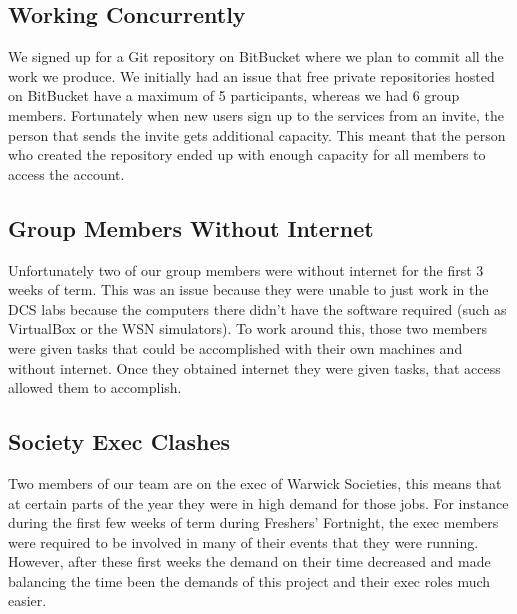 \subsection{Working Concurrently}

We signed up for a Git repository on BitBucket \cite{bitbucket} where we plan to commit all the work we produce. We initially had an issue that free private repositories hosted on BitBucket have a maximum of 5 participants, whereas we had 6 group members. Fortunately when new users sign up to the services from an invite, the person that sends the invite gets additional capacity. This meant that the person who created the repository ended up with enough capacity for all members to access the account.

\subsection{Group Members Without Internet}
Unfortunately two of our group members were without internet for the first 3 weeks of term. This was an issue because they were unable to just work in the DCS labs because the computers there didn't have the software required (such as VirtualBox or the WSN simulators). To work around this, those two members were given tasks that could be accomplished with their own machines and without internet. Once they obtained internet they were given tasks, that access allowed them to accomplish.

\subsection{Society Exec Clashes}
Two members of our team are on the exec of Warwick Societies, this means that at certain parts of the year they were in high demand for those jobs. For instance during the first few weeks of term during Freshers' Fortnight, the exec members were required to be involved in many of their events that they were running. However, after these first weeks the demand on their time decreased and made balancing the time been the demands of this project and their exec roles much easier.

